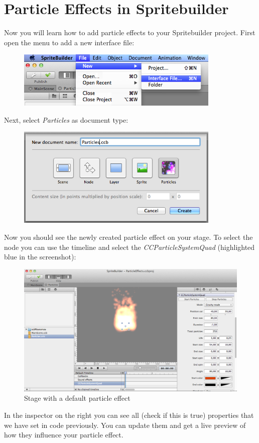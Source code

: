 \documentclass{scrreprt}
\begin{document}
\section{Particle Effects in Spritebuilder}
Now you will learn how to add particle effects to your Spritebuilder project.
First open the menu to add a new interface file: 
\begin{figure}[H]
		\centering
		\includegraphics[width=275pt]{images/particles/Spritebuilder_ParticleEffect_Menu1.png}   
\end{figure}
Next, select \textit{Particles} as document type:
\begin{figure}[H]
		\centering
		\includegraphics[width=275pt]{images/particles/Spritebuilder_ParticleEffect_Menu2.png}   
\end{figure}
Now you should see the newly created particle effect on your stage. To select
the node you can use the timeline and select the \textit{CCParticleSystemQuad}
(highlighted blue in the screenshot):
\begin{figure}[H]
		\centering
		\includegraphics[width=375pt]{images/particles/Spritebuilder_ParticleEffect_CCB.png}   
		\caption{Stage with a default particle effect}
\end{figure}
In the inspector on the right you can see all (check if this is true) properties
that we have set in code previously. You can update them and get a live preview
of how they influence your particle effect. 
\end{document}
